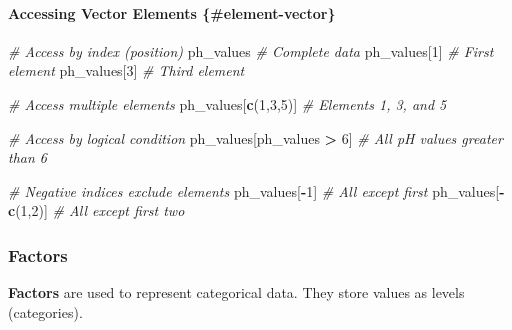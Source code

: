 \documentclass[
  10pt,
  b5paper,
  oneside]{book}
\newenvironment{Shaded}{\begin{snugshade}}{\end{snugshade}}
\newcommand{\CommentTok}[1]{\textcolor[rgb]{0.56,0.35,0.01}{\textit{#1}}}
\newcommand{\DecValTok}[1]{\textcolor[rgb]{0.00,0.00,0.81}{#1}}
\newcommand{\FunctionTok}[1]{\textcolor[rgb]{0.13,0.29,0.53}{\textbf{#1}}}
\newcommand{\NormalTok}[1]{#1}
\newcommand{\SpecialCharTok}[1]{\textcolor[rgb]{0.81,0.36,0.00}{\textbf{#1}}}
\begin{document}
\paragraph*{Accessing Vector Elements \{\#element-vector\}}\label{accessing-vector-elements-element-vector}

\begin{Shaded}
\begin{Highlighting}[]
\CommentTok{\# Access by index (position)}
\NormalTok{ph\_values           }\CommentTok{\# Complete data}
\NormalTok{ph\_values[}\DecValTok{1}\NormalTok{]        }\CommentTok{\# First element}
\NormalTok{ph\_values[}\DecValTok{3}\NormalTok{]        }\CommentTok{\# Third element}

\CommentTok{\# Access multiple elements}
\NormalTok{ph\_values[}\FunctionTok{c}\NormalTok{(}\DecValTok{1}\NormalTok{,}\DecValTok{3}\NormalTok{,}\DecValTok{5}\NormalTok{)]  }\CommentTok{\# Elements 1, 3, and 5}

\CommentTok{\# Access by logical condition}
\NormalTok{ph\_values[ph\_values }\SpecialCharTok{\textgreater{}} \DecValTok{6}\NormalTok{]     }\CommentTok{\# All pH values greater than 6}

\CommentTok{\# Negative indices exclude elements}
\NormalTok{ph\_values[}\SpecialCharTok{{-}}\DecValTok{1}\NormalTok{]       }\CommentTok{\# All except first}
\NormalTok{ph\_values[}\SpecialCharTok{{-}}\FunctionTok{c}\NormalTok{(}\DecValTok{1}\NormalTok{,}\DecValTok{2}\NormalTok{)]  }\CommentTok{\# All except first two}
\end{Highlighting}
\end{Shaded}

\subsubsection{Factors}\label{factor-data}

\textbf{Factors} are used to represent categorical data.
They store values as levels (categories).
\end{document}
